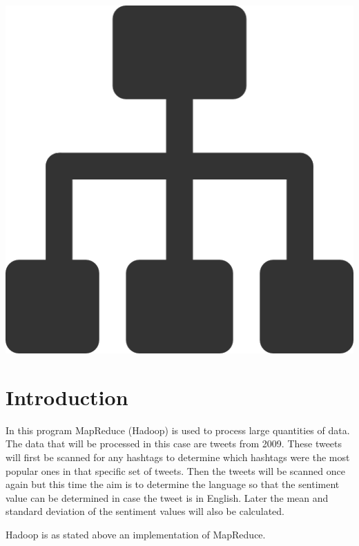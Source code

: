 \documentclass[a4paper,12px]{article}
\begin{document}
\vspace{2cm}
\begin{center}
    \includegraphics[width=(\textwidth/5*3)]{parallel_tasks}
\end{center}
\clearpage

\tableofcontents
\vspace{5mm}


\section{Introduction}

In this program MapReduce (Hadoop) is used to process large quantities of data.
The data that will be processed in this case are tweets from 2009. These tweets
will first be scanned for any hashtags to determine which hashtags were the most
popular ones in that specific set of tweets. Then the tweets will be scanned
once again but this time the aim is to determine the language so that the
sentiment value can be determined in case the tweet is in English. Later the
mean and standard deviation of the sentiment values will also be calculated.

Hadoop is as stated above an implementation of MapReduce.
\end{document}
